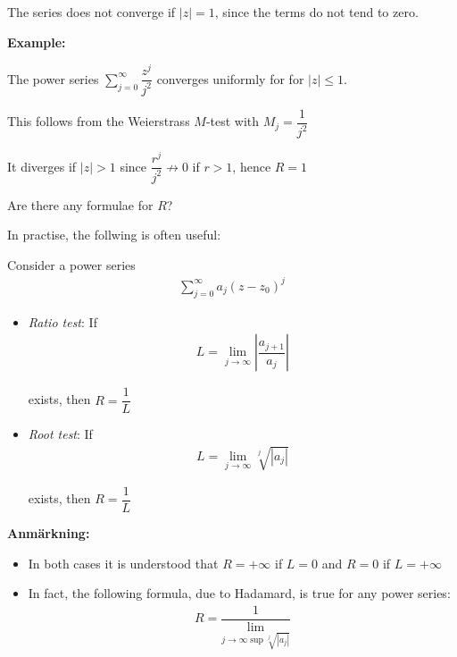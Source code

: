 \noindent The series does not converge if $\left|z\right| = 1$, since the terms do not tend to zero.
\par\bigskip
\noindent\textbf{Example:}\par
\noindent The power series $\sum_{j=0}^{\infty}\dfrac{z^j}{j^2}$ converges uniformly for for $\left|z\right|\leq 1$.\par
\noindent This follows from the Weierstrass $M$-test with $M_j = \dfrac{1}{j^2}$\par
\noindent It diverges if $\left|z\right|>1$ since $\dfrac{r^j}{j^2}\not\to0$ if $r>1$, hence $R = 1$
\par\bigskip
\noindent Are there any formulae for $R$?\par
\noindent In practise, the follwing is often useful:
\par\bigskip
\begin{theo}[]{}
  Consider a power series
  \begin{equation*}
    \begin{gathered}
      \sum_{j=0}^{\infty}a_j(z-z_0)^j
    \end{gathered}
  \end{equation*}
  \par\bigskip
  \begin{itemize}[leftmargin=*]
    \item\textit{Ratio test}: If
      \begin{equation*}
        \begin{gathered}
          L = \lim_{j\to\infty}\left|\dfrac{a_{j+1}}{a_j}\right|
        \end{gathered}
      \end{equation*}\par
      exists, then $R = \dfrac{1}{L}$
      \par\bigskip
    \item\textit{Root test}: If
      \begin{equation*}
        \begin{gathered}
          L = \lim_{j\to\infty}\sqrt[j]{\left|a_j\right|}
        \end{gathered}
      \end{equation*}\par
      exists, then $R = \dfrac{1}{L}$
  \end{itemize}
\end{theo}
\par\bigskip
\noindent\textbf{Anmärkning:}\par
\begin{itemize}
  \item In both cases it is understood that $R = +\infty$ if $L = 0$ and $R = 0$ if $L = +\infty$
  \item In fact, the following formula, due to Hadamard, is true for any power series:
    \begin{equation*}
      \begin{gathered}
        R = \dfrac{1}{\lim_{j\to\infty\sup\sqrt[j]{\left|a_j\right|}}}
      \end{gathered}
    \end{equation*}
\end{itemize}
